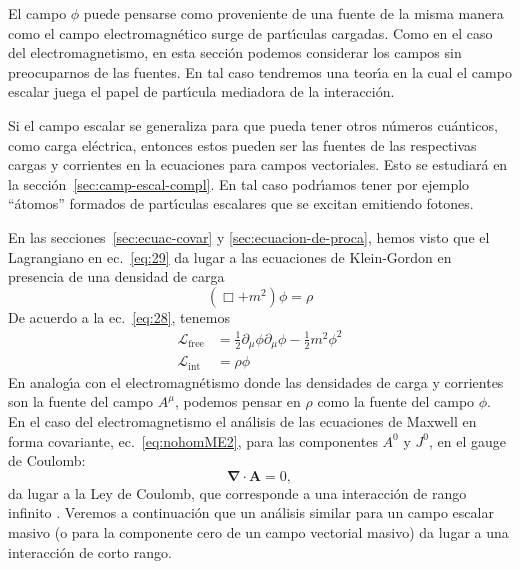 El campo $\phi$ puede pensarse como proveniente de una fuente de la misma manera como el campo electromagn\'etico surge de part\'\i culas cargadas. Como en el caso del electromagnetismo, en esta secci\'on podemos considerar los campos sin preocuparnos de las fuentes. 
En tal caso tendremos una teor\'\i a en la cual el campo escalar juega el papel de part\'\i cula mediadora de la interacci\'on.

Si el campo escalar se generaliza para que pueda tener otros n\'umeros
cu\'anticos, como carga el\'ectrica, entonces estos pueden ser las fuentes
de las respectivas cargas y corrientes en la ecuaciones para campos
vectoriales. Esto se estudiar\'a en la
secci\'on~\ref{sec:camp-escal-compl}. En tal caso podr\'\i amos tener por
ejemplo ``\'atomos'' formados de part\'\i culas escalares que se excitan
emitiendo fotones.


En las secciones~\ref{sec:ecuac-covar} y \ref{sec:ecuacion-de-proca},
hemos visto que el Lagrangiano en ec.~\eqref{eq:29} da lugar a las
ecuaciones de Klein-Gordon en presencia de una densidad de carga
\begin{equation}
  \label{eq:30}
  (\Box+m^2)\phi=\rho
\end{equation}
De acuerdo a la ec.~\eqref{eq:28}, tenemos
\begin{align}
\mathcal{L}_{\text{free}}&=\frac{1}{2}\partial_\mu\phi\partial_\mu\phi-\frac{1}{2} m^2\phi^2\nonumber\\
\label{eq:31}
\mathcal{L}_{\text{int}}&=\rho\phi
\end{align}
En analog\'\i a con el electromagn\'etismo donde las densidades de carga y
corrientes son la fuente del campo $A^\mu$, podemos pensar en $\rho$ como
la fuente del campo $\phi$. En el caso del electromagnetismo el an\'alisis
de las ecuaciones de Maxwell en forma covariante,
ec.~\eqref{eq:nohomME2}, para las componentes $A^0$ y $J^0$, en el
gauge de Coulomb:
\begin{equation}
  \label{eq:32}
  \boldsymbol{\nabla}\cdot\mathbf{A}=0,
\end{equation}
da lugar a la Ley de Coulomb, que corresponde a una interacci\'on de
rango infinito \cite{Gross}. Veremos a continuaci\'on que un an\'alisis
similar para un campo escalar masivo (o para la componente cero de un
campo vectorial masivo) da lugar a una interacci\'on de corto rango.

